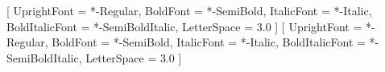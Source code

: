 \usepackage{inputenc}
\usepackage[T1]{fontenc}
\usepackage{lmodern}
\usepackage{fontspec}
\usepackage{setspace}
\usepackage{xcolor}
\usepackage{morefloats}
\usepackage[table]{xcolor}

\usepackage[protrusion=true,expansion=false]{microtype}



\usepackage{scalefnt}
\setmainfont{Inter}[
    UprightFont = *-Regular,
    BoldFont = *-SemiBold,
    ItalicFont = *-Italic,
    BoldItalicFont = *-SemiBoldItalic,
    LetterSpace = 3.0 %
]
\setsansfont{Inter}[
    UprightFont = *-Regular,
    BoldFont = *-SemiBold,
    ItalicFont = *-Italic,
    BoldItalicFont = *-SemiBoldItalic,
    LetterSpace = 3.0 %
]

\newcommand{\brandname}[1]{{\addfontfeatures{LetterSpace=12.0}\textsc{#1}}}
\newcommand{\productname}[1]{{\addfontfeatures{LetterSpace=8.0}\textbf{#1}}}

\usepackage{geometry}
\geometry{
    top=1.2in,
    bottom=1.2in,
    left=1.1in,
    right=1.1in,
    headheight=14pt,
    headsep=0.3in,
    footskip=0.4in
}

\usepackage{placeins}
\usepackage{flafter}
\usepackage{fixltx2e}


\usepackage{microtype}  %
\usepackage{parskip}    %
\usepackage{soul}       %
\usepackage{ragged2e}   %
\usepackage{textcase}   %
\usepackage{relsize}    %

